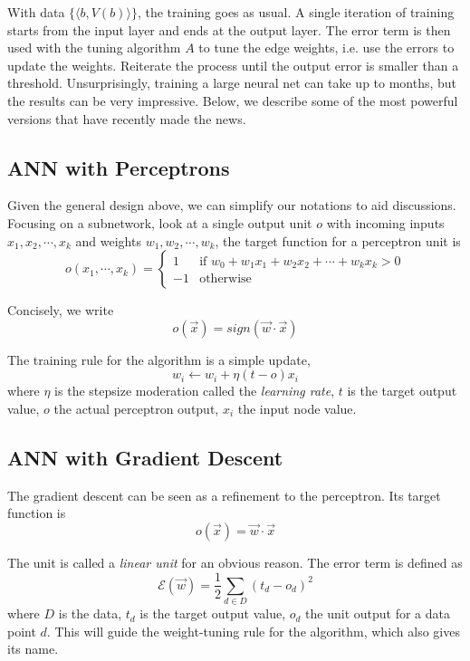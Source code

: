 \documentclass[12pt]{article}  %
\begin{document}
With data $\{\langle b, V(b) \rangle\}$, the training goes as usual. A single iteration of training starts from the input layer and ends at the output layer. The error term is then used with the tuning algorithm $A$ to tune the edge weights, i.e. use the errors to update the weights. Reiterate the process until the output error is smaller than a threshold. Unsurprisingly, training a large neural net can take up to months, but the results can be very impressive. Below, we describe some of the most powerful versions that have recently made the news.





\subsection{ANN with Perceptrons}

Given the general design above, we can simplify our notations to aid discussions. Focusing on a subnetwork, look at a single output unit $o$ with incoming inputs $x_1, x_2, \cdots, x_k$ and weights $w_1, w_2, \cdots, w_k$, the target function for a perceptron unit is
\[
o(x_1, \cdots, x_k) =
\begin{cases}
1 &\text{if } w_0 + w_1 x_1 + w_2 x_2 + \cdots + w_k x_k > 0\\
-1 &\text{otherwise }
\end{cases}
\]

Concisely, we write $$o(\vec{x}) = sign(\vec{w} \cdot \vec{x})$$

The training rule for the algorithm is a simple update, $$w_i \leftarrow w_i + \eta(t-o)x_i$$ where $\eta$ is the stepsize moderation called the {\em learning rate}, $t$ is the target output value, $o$ the actual perceptron output, $x_i$ the input node value.




\subsection{ANN with Gradient Descent}

The gradient descent can be seen as a refinement to the perceptron. Its target function is $$o(\vec{x}) = \vec{w} \cdot \vec{x}$$

The unit is called a {\em linear unit} for an obvious reason. The error term is defined as $$\mathcal{E}(\vec{w}) = \frac{1}{2} \sum_{d \in D} (t_d - o_d)^2$$ where $D$ is the data, $t_d$ is the target output value, $o_d$ the unit output for a data point $d$. This will guide the weight-tuning rule for the algorithm, which also gives its name.
\end{document}
